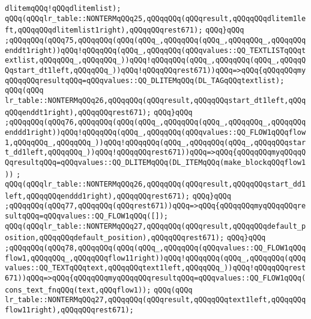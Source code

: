 \verb|dlitemqQQq!qQQqdlitemlist);|\newline
\verb|qQQq(qQQqlr_table::NONTERMqQQq25,qQQqqQQq(qQQqresult,qQQqqQQqdlitem1left,qQQqqQQqdlitemlist1right),qQQqqQQqrest671);|\newline
\verb|qQQq}qQQq|\newline
\verb|;qQQqqQQq(qQQq75,qQQqqQQq(qQQq(qQQq_,qQQqqQQq(qQQq_,qQQqqQQq_,qQQqqQQqenddt1right))qQQq!qQQqqQQq(qQQq_,qQQqqQQq(qQQqvalues::QQ_TEXTLISTqQQqtextlist,qQQqqQQq_,qQQqqQQq_))qQQq!qQQqqQQq(qQQq_,qQQqqQQq(qQQq_,qQQqqQQqstart_dt1left,qQQqqQQq_))qQQq!qQQqqQQqrest671))qQQq=>qQQq{qQQqqQQqmyqQQqqQQqresultqQQq=qQQqvalues::QQ_DLITEMqQQq(DL_TAGqQQqtextlist);|\newline
\verb|qQQq(qQQq|\newline
\verb|lr_table::NONTERMqQQq26,qQQqqQQq(qQQqresult,qQQqqQQqstart_dt1left,qQQqqQQqenddt1right),qQQqqQQqrest671);|\newline
\verb|qQQq}qQQq|\newline
\verb|;qQQqqQQq(qQQq76,qQQqqQQq(qQQq(qQQq_,qQQqqQQq(qQQq_,qQQqqQQq_,qQQqqQQqenddd1right))qQQq!qQQqqQQq(qQQq_,qQQqqQQq(qQQqvalues::QQ_FLOW1qQQqflow1,qQQqqQQq_,qQQqqQQq_))qQQq!qQQqqQQq(qQQq_,qQQqqQQq(qQQq_,qQQqqQQqstart_dd1left,qQQqqQQq_))qQQq!qQQqqQQqrest671))qQQq=>qQQq{qQQqqQQqmyqQQqqQQqresultqQQq=qQQqvalues::QQ_DLITEMqQQq(DL_ITEMqQQq(make_blockqQQqflow1))|\newline
\verb|;|\newline
\verb|qQQq(qQQqlr_table::NONTERMqQQq26,qQQqqQQq(qQQqresult,qQQqqQQqstart_dd1left,qQQqqQQqenddd1right),qQQqqQQqrest671);|\newline
\verb|qQQq}qQQq|\newline
\verb|;qQQqqQQq(qQQq77,qQQqqQQq(qQQqrest671))qQQq=>qQQq{qQQqqQQqmyqQQqqQQqresultqQQq=qQQqvalues::QQ_FLOW1qQQq([]);|\newline
\verb|qQQq(qQQqlr_table::NONTERMqQQq27,qQQqqQQq(qQQqresult,qQQqqQQqdefault_position,qQQqqQQqdefault_position),qQQqqQQqrest671);|\newline
\verb|qQQq}qQQq|\newline
\verb|;qQQqqQQq(qQQq78,qQQqqQQq(qQQq(qQQq_,qQQqqQQq(qQQqvalues::QQ_FLOW1qQQqflow1,qQQqqQQq_,qQQqqQQqflow11right))qQQq!qQQqqQQq(qQQq_,qQQqqQQq(qQQqvalues::QQ_TEXTqQQqtext,qQQqqQQqtext1left,qQQqqQQq_))qQQq!qQQqqQQqrest671))qQQq=>qQQq{qQQqqQQqmyqQQqqQQqresultqQQq=qQQqvalues::QQ_FLOW1qQQq(cons_text_fnqQQq(text,qQQqflow1));|\newline
\verb|qQQq(qQQq|\newline
\verb|lr_table::NONTERMqQQq27,qQQqqQQq(qQQqresult,qQQqqQQqtext1left,qQQqqQQqflow11right),qQQqqQQqrest671);|\newline
